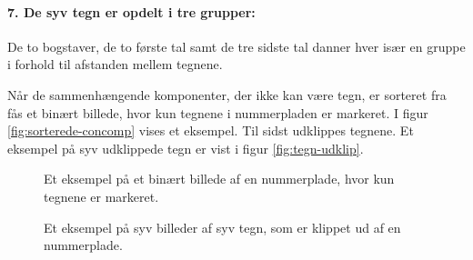\paragraph{7. De syv tegn er opdelt i tre grupper:} De to bogstaver, de to første tal samt de tre sidste tal danner hver især en gruppe i forhold til afstanden mellem tegnene.

Når de sammenhængende komponenter, der ikke kan være tegn, er sorteret fra fås et binært billede, hvor kun tegnene i nummerpladen er markeret. I figur \vref{fig:sorterede-concomp} vises et eksempel. Til sidst udklippes tegnene. Et eksempel på syv udklippede tegn er vist i figur \vref{fig:tegn-udklip}.

\begin{figure}[htp]
  \centering
  \caption{Et eksempel på et binært billede af en nummerplade, hvor kun tegnene er markeret.}
  \label{fig:sorterede-concomp}
\end{figure}

\begin{figure}[htp]
  \centering
  \begin{minipage}[c]{8 cm}
	\end{minipage}
  \caption{Et eksempel på syv billeder af syv tegn, som er klippet ud af en nummerplade.}
  \label{fig:tegn-udklip}
\end{figure}

